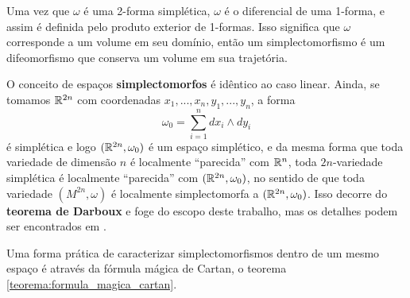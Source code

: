 Uma vez que $\omega$ é uma 2-forma simplética, $\omega$ é o diferencial de uma 1-forma, e assim é definida pelo produto exterior de 1-formas. Isso significa que $\omega$ corresponde a um volume em seu domínio, então um simplectomorfismo é um difeomorfismo que conserva um volume em sua trajetória.

O conceito de espaços \textbf{simplectomorfos} é idêntico ao caso linear. Ainda, se tomamos $\mathbb{R}^{2n}$ com coordenadas $x_1, ..., x_n, y_1, ..., y_n$, a forma
\begin{equation*}
    \omega_0 = \sum_{i=1}^{n} dx_i \wedge dy_i
\end{equation*}
é simplética e logo $(\mathbb{R}^{2n}, \omega_0)$ é um espaço simplético, e da mesma forma que toda variedade de dimensão $n$ é localmente ``parecida'' com $\mathbb{R}^n$, toda $2n$-variedade simplética é localmente ``parecida'' com $(\mathbb{R}^{2n}, \omega_0)$, no sentido de que toda variedade $(M^{2n}, \omega)$ é localmente simplectomorfa a $(\mathbb{R}^{2n}, \omega_0)$. Isso decorre do \textbf{teorema de Darboux} e foge do escopo deste trabalho, mas os detalhes podem ser encontrados em \cite[7]{silva_lectures_2001}.

Uma forma prática de caracterizar simplectomorfismos dentro de um mesmo espaço é através da fórmula mágica de Cartan, o teorema \ref{teorema:formula_magica_cartan}.

